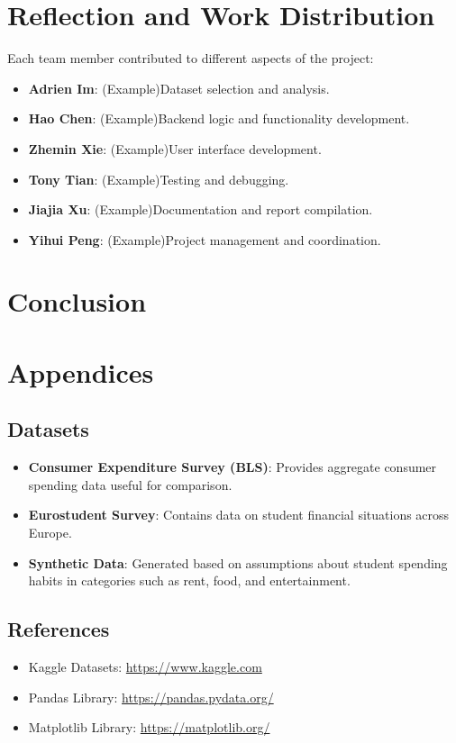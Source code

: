 \documentclass{article}
\begin{document}
\section{Reflection and Work Distribution}
Each team member contributed to different aspects of the project: \begin{itemize} \item \textbf{Adrien Im}: (Example)Dataset selection and analysis. \item \textbf{Hao Chen}: (Example)Backend logic and functionality development. \item \textbf{Zhemin Xie}: (Example)User interface development. \item \textbf{Tony Tian}: (Example)Testing and debugging. \item \textbf{Jiajia Xu}: (Example)Documentation and report compilation. \item \textbf{Yihui Peng}: (Example)Project management and coordination. \end{itemize}

\section{Conclusion}


\section{Appendices}
\subsection{Datasets}
\begin{itemize}
    \item \textbf{Consumer Expenditure Survey (BLS)}: Provides aggregate consumer spending data useful for comparison.
    \item \textbf{Eurostudent Survey}: Contains data on student financial situations across Europe.
    \item \textbf{Synthetic Data}: Generated based on assumptions about student spending habits in categories such as rent, food, and entertainment.
\end{itemize}

\subsection{References}
\begin{itemize}
    \item Kaggle Datasets: \url{https://www.kaggle.com}
    \item Pandas Library: \url{https://pandas.pydata.org/}
    \item Matplotlib Library: \url{https://matplotlib.org/}
\end{itemize}
\end{document}
